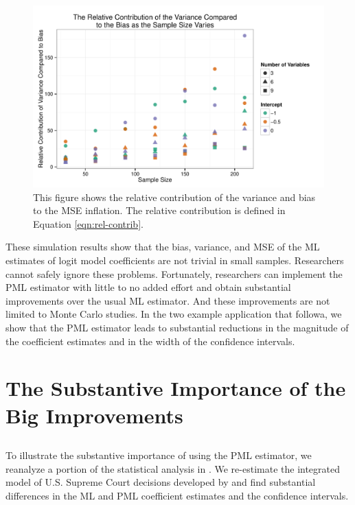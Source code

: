 \documentclass[12pt]{article}
\begin{document}
\begin{figure}[h]
\begin{center}
\includegraphics[scale = 0.7]{figs/relcontrib-n-scatter.pdf}
\caption{This figure shows the relative contribution of the variance and bias to the MSE inflation. The relative contribution is defined in Equation \ref{eqn:rel-contrib}.}\label{fig:relcontrib-n-scatter}
\end{center}
\end{figure}

These simulation results show that the bias, variance, and MSE of the ML estimates of logit model coefficients are not trivial in small samples.
Researchers cannot safely ignore these problems.
Fortunately, researchers can implement the PML estimator with little to no added effort and obtain substantial improvements over the usual ML estimator. 
And these improvements are not limited to Monte Carlo studies. 
In the two example application that followa, we show that the PML estimator leads to substantial reductions in the magnitude of the coefficient estimates and in the width of the confidence intervals.

\section*{The Substantive Importance of the Big Improvements}

\subsection*{\cite{GeorgeEpstein1992}}

To illustrate the substantive importance of using the PML estimator, we reanalyze a portion of the statistical analysis in \cite{GeorgeEpstein1992}. 
We re-estimate the integrated model of U.S. Supreme Court decisions developed by \cite{GeorgeEpstein1992} and find substantial differences in the ML and PML coefficient estimates and the confidence intervals.
\end{document}
